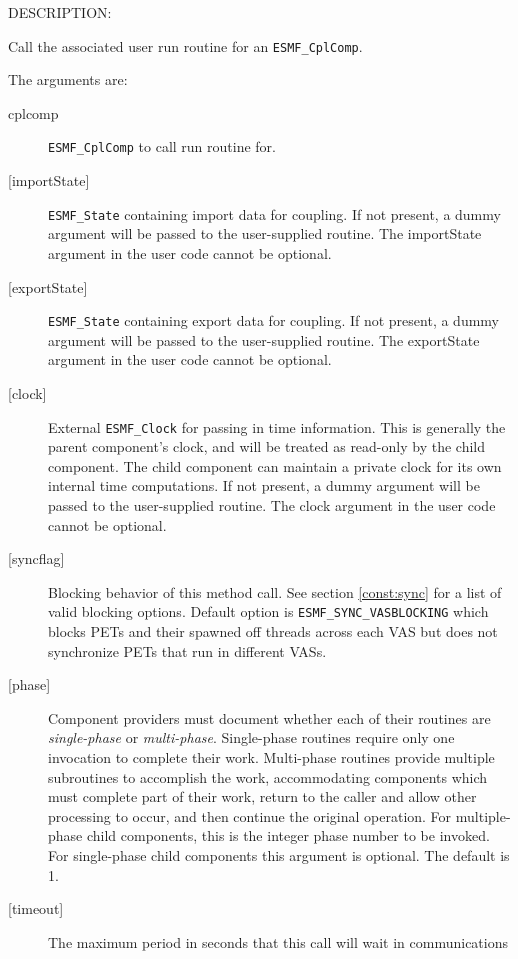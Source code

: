 {\sf DESCRIPTION:\\ }


   Call the associated user run routine for
   an {\tt ESMF\_CplComp}.
  
   The arguments are:
   \begin{description}
   \item[cplcomp]
     {\tt ESMF\_CplComp} to call run routine for.
   \item[{[importState]}]
     {\tt ESMF\_State} containing import data for coupling. If not present, a dummy
     argument will be passed to the user-supplied routine.  The
     importState argument in the user code cannot be optional.
   \item[{[exportState]}]
     {\tt ESMF\_State} containing export data for coupling. If not present, a dummy
     argument will be passed to the user-supplied routine.  The
     exportState argument in the user code cannot be optional.
   \item[{[clock]}]
     External {\tt ESMF\_Clock} for passing in time information.
     This is generally the parent component's clock, and will be treated
     as read-only by the child component.  The child component can maintain
     a private clock for its own internal time computations. If not present, a dummy
     argument will be passed to the user-supplied routine.  The
     clock argument in the user code cannot be optional.
   \item[{[syncflag]}]
     Blocking behavior of this method call. See section \ref{const:sync}
     for a list of valid blocking options. Default option is
     {\tt ESMF\_SYNC\_VASBLOCKING} which blocks PETs and their spawned off threads
     across each VAS but does not synchronize PETs that run in different VASs.
   \item[{[phase]}]
     Component providers must document whether each of their
     routines are {\em single-phase} or {\em multi-phase}.
     Single-phase routines require only one invocation to complete
     their work.
     Multi-phase routines provide multiple subroutines to accomplish
     the work, accommodating components which must complete part of their
     work, return to the caller and allow other processing to occur,
     and then continue the original operation.
     For multiple-phase child components, this is the integer phase
     number to be invoked.
     For single-phase child components this argument is optional. The default is
     1.
   \item[{[timeout]}]
     The maximum period in seconds that this call will wait in communications

\end{description}
